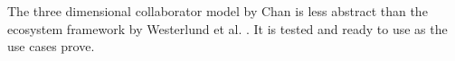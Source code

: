 The three dimensional collaborator model by Chan is less abstract than the ecosystem framework by Westerlund et al. \cite{westerlund}. It is tested and ready to use as the use cases prove.








